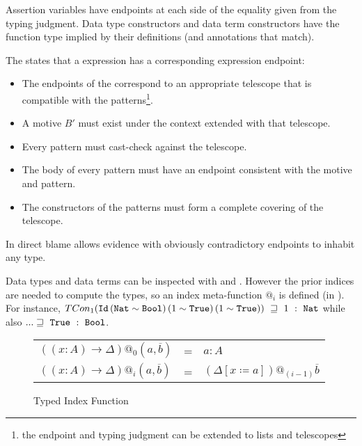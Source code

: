
Assertion variables have endpoints at each side of the equality given from the typing judgment.
Data type constructors and data term constructors have the function type implied by their definitions (and annotations that match).

The  states that a \case{} expression has a corresponding \case{} expression endpoint:
\begin{itemize}
  \item The endpoints of the \scruts{} correspond to an appropriate telescope that is compatible with the patterns\footnote{the endpoint and typing judgment can be extended to lists and telescopes}.
  \item A motive $B'$ must exist under the context extended with that telescope.
  \item Every pattern must cast-check against the telescope.
  \item The body of every pattern must have an endpoint consistent with the motive and pattern.
  \item The constructors of the patterns must form a complete covering of the telescope.
\end{itemize}
  
In  direct blame allows evidence with obviously contradictory endpoints to inhabit any type.

Data types and data terms can be inspected with  and .
However the prior indices are needed to compute the types, so an index meta-function $@_{i}$ is defined (in ).
For instance, $TCon_1 (\Id{}\, (\Nat{}\sim\Bool{})\,(1\sim\True{})\,(1\sim\True{}))\ \sqsupseteq\  1\ :\ \Nat{}$ while also  $... \sqsupseteq\  \mathtt{True}{}\ :\ \mathtt{Bool}{}$.

\begin{figure}

\begin{tabular}{lll}
  $\left(\left(x:A\right)\rightarrow\Delta\right)@_{0}\left(a,\overline{b}\right)$ & = & $a:A$\tabularnewline
  $\left(\left(x:A\right)\rightarrow\Delta\right)@_{i}\left(a,\overline{b}\right)$ & = & $\left(\Delta\left[x\coloneqq a\right]\right)@_{\left(i-1\right)}\overline{b}$\tabularnewline
\end{tabular}
\caption{Typed Index Function}
\label{fig:cast-Data-index-1}
\end{figure}